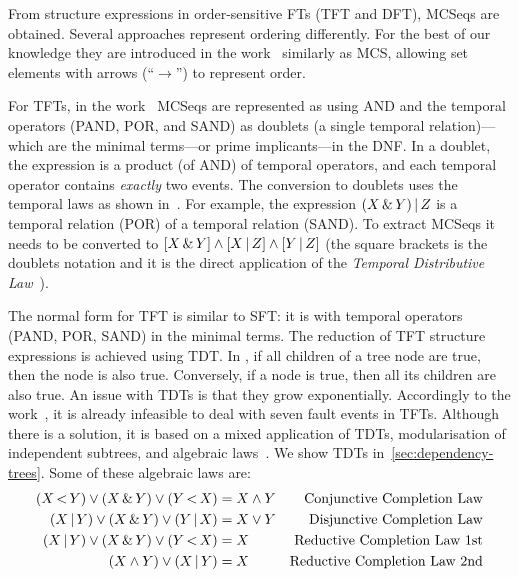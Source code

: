 \documentclass[12pt,openright,twoside,a4paper,oldfontcommands,english,brazil,draft]{abntex2}
\theoremstyle{theo}
\newcommand{\parsin}[1]{\ensuremath\left( #1 \right)}
\newcommand{\squaresin}[1]{\ensuremath\left[ #1 \right]}
\def\pand{\ensuremath\operatorname{<}}
\def\por{\ensuremath\operatorname{|}}
\def\sand{\ensuremath\operatorname{\&}}
\begin{document}
From structure expressions in order-sensitive \acp{FT} (\ac{TFT} and \ac{DFT}), \acp{MCSeq} are obtained.
Several approaches represent  ordering differently.
For the best of our knowledge they are introduced in the work~\cite{TD2004} similarly as \ac{MCS}, allowing set elements with arrows (``$\rightarrow$'') to represent order.

For \acp{TFT}, in the work~\cite{Walker2009} \acp{MCSeq} are represented as  using \ac{AND} and the temporal operators (\ac{PAND}, \ac{POR}, and \ac{SAND}) as doublets (a single temporal relation)---which are the minimal terms---or prime implicants---in the \ac{DNF}.
In a doublet, the expression is a product (of \ac{AND}) of temporal operators, and each temporal operator contains \emph{exactly} two events.
The conversion to doublets uses the temporal laws as shown in~\cite{Walker2009}.
For example, the expression $\parsin{X \sand Y} \por Z$ is a temporal relation (\ac{POR}) of a temporal relation (\ac{SAND}).
To extract \acp{MCSeq} it needs to be converted to $\squaresin{X \sand Y} \land \squaresin{X \por Z} \land \squaresin{Y \por Z} $ (the square brackets is the doublets notation and it is the direct application of the \emph{Temporal Distributive Law}~\cite[p. 120]{Walker2009}).

The normal form for \ac{TFT} is similar to \ac{SFT}: it is  with temporal operators (\ac{PAND}, \ac{POR}, \ac{SAND}) in the minimal terms.
The reduction of \ac{TFT} structure expressions is achieved using \ac{TDT}.
In , if all children of a tree node are true, then the node is also true.
Conversely, if a node is true, then all its children are also true.
An issue with \acp{TDT} is that they grow exponentially.
Accordingly to the work~\cite{WP2010}, it is already infeasible to deal with seven fault events in TFTs.
Although there is a solution, it is based on a mixed application of \acp{TDT}, modularisation of independent subtrees, and algebraic laws~\cite{WP2009}.
We show \acp{TDT} in~\cref{sec:dependency-trees}.
Some of these algebraic laws are:
%
\begin{subequations}
\begin{align}
  \parsin{X \pand Y} \lor \parsin{X \sand Y} \lor \parsin{Y \pand X} &= X \land Y & \text{Conjunctive Completion Law}\label{law:tft-conjunctive-completion-law}\\
  \parsin{X \por Y} \lor \parsin{X \sand Y} \lor \parsin{Y \por X} &= X \lor Y & \text{Disjunctive Completion Law}\\
  \parsin{X \por Y} \lor \parsin{X \sand Y} \lor \parsin{Y \pand X} &= X & \text{Reductive Completion Law 1st}\\
  \parsin{X \land Y} \lor \parsin{X \por Y}  &= X & \text{Reductive Completion Law 2nd}
\end{align}
\end{subequations}
\end{document}
